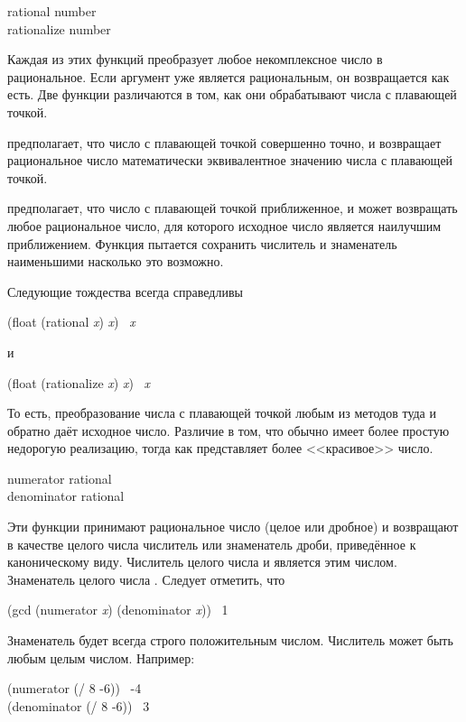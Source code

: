 \begin{defun}[Функция]
rational number \\
rationalize number

Каждая из этих функций преобразует любое некомплексное число в рациональное.
Если аргумент уже является рациональным, он возвращается как есть.
Две функции различаются в том, как они обрабатывают числа с плавающей точкой.

 предполагает, что число с плавающей точкой совершенно точно, и
возвращает рациональное число математически эквивалентное значению числа с
плавающей точкой.

 предполагает, что число с плавающей точкой приближенное, и
может возвращать любое рациональное число, для которого исходное число является
наилучшим приближением. Функция пытается сохранить числитель и знаменатель
наименьшими насколько это возможно.

Следующие тождества всегда справедливы
\begin{lisp}
(float (rational \emph{x}) \emph{x}) \EQ\ \emph{x}
\end{lisp}
и
\begin{lisp}
(float (rationalize \emph{x}) \emph{x}) \EQ\ \emph{x}
\end{lisp}
То есть, преобразование числа с плавающей точкой любым из методов туда и обратно
даёт исходное число.
Различие в том, что  обычно имеет более простую недорогую
реализацию, тогда как  представляет более <<красивое>> число.
\end{defun}

\begin{defun}[Функция]
numerator rational \\
denominator rational

Эти функции принимают рациональное число (целое или дробное)
и возвращают в качестве целого числа числитель или знаменатель дроби,
приведённое к каноническому виду. Числитель целого числа и является этим
числом. Знаменатель целого числа . Следует отметить, что
\begin{lisp}
(gcd (numerator \emph{x}) (denominator \emph{x})) \EV\ 1
\end{lisp}
Знаменатель будет всегда строго положительным числом. Числитель может быть любым
целым числом.
Например:
\begin{lisp}
(numerator (/ 8 -6)) \EV\ -4 \\
(denominator (/ 8 -6)) \EV\ 3
\end{lisp}
\end{defun}

